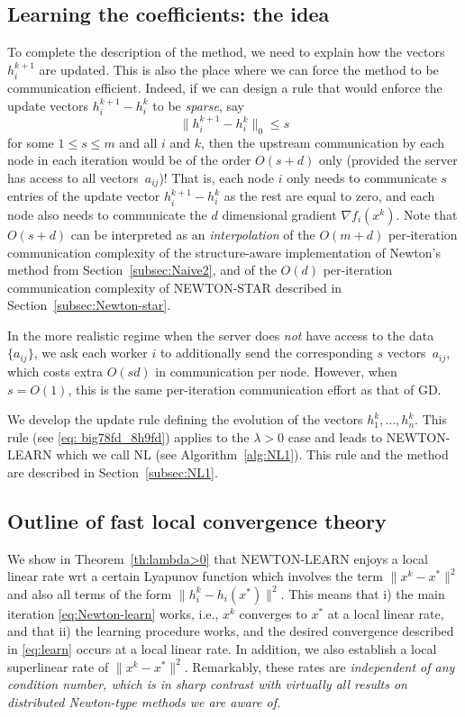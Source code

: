 \documentclass[12pt]{article}
\newcommand{\newalpha}{h}
\begin{document}
\subsection{Learning the coefficients: the idea}
To complete the description of the method, we need to explain how the vectors $h_i^{k+1}$ are updated. This is also the place where we can force the method to be communication efficient. Indeed, if we can design a rule that would enforce the update vectors $h_i^{k+1}-h_i^k$ to be {\em sparse}, say \begin{equation}\label{eq:sparse_update}\|h_i^{k+1}-h_i^k\|_0 \leq s \end{equation} for some $1 \leq s \leq m$ and all $i$ and $k$, then  the upstream communication by each node in each iteration would be of the order $O(s+d)$ only (provided the server has access to all vectors~$a_{ij}$)! That is, each node $i$ only needs to communicate $s$ entries of the update vector $h_i^{k+1}-h_i^k$ as the rest are equal to zero, and each node also needs to communicate the $d$ dimensional gradient $\nabla f_i(x^k)$.  Note that $O(s+d)$ can be interpreted as an {\em interpolation} of the $O(m+d)$   per-iteration communication complexity  of the structure-aware implementation of Newton's method from  Section~\ref{subsec:Naive2}, and of the  $O(d)$   per-iteration communication complexity  of {\sf NEWTON-STAR} described in   Section~\ref{subsec:Newton-star}. 

In the more realistic regime when the server does {\em not} have access to the data~$\{a_{ij}\}$, we ask each worker $i$ to additionally send the corresponding $s$ vectors~$a_{ij}$, which costs extra $O(s d)$ in communication per node. However, when $s=O(1)$, this is the same per-iteration communication effort as that of GD.

We develop the update rule defining the evolution of the vectors $h_1^k, \dots, h_n^k$. This rule (see \eqref{eq: big78fd_8h9fd}) applies to the $\lambda>0$ case and leads to {\sf NEWTON-LEARN} which we call {\sf NL} (see Algorithm~\ref{alg:NL1}). This rule and the method are described in Section~\ref{subsec:NL1}. 


\subsection{Outline of fast local convergence theory} We show in Theorem~\ref{th:lambda>0} that {\sf NEWTON-LEARN} enjoys a local linear rate wrt a certain Lyapunov function which  involves the term $\|x^k - x^*\|^2$ and also all terms of the form $\|h^k_i - \newalpha_i(x^*)\|^2$. This means that i) the main iteration \eqref{eq:Newton-learn} works, i.e., $x^k$ converges to $x^*$ at a local linear  rate, and that ii) the learning procedure works, and the desired convergence described in \eqref{eq:learn} occurs at a local linear rate. In addition, we also establish a local superlinear rate of $\|x^k - x^*\|^2$. Remarkably,  these rates are {\em independent of any condition number, which is  in sharp contrast with virtually all results on distributed Newton-type methods we are aware of.} 
\end{document}
